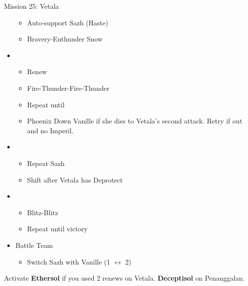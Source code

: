 \begin{multicols}{2}
\begin{battle}[0:38]{Mission 25: Vetala}
\begin{itemize}
\begin{itemize}
				      \item Auto-support Sazh (Haste)
				      \item Bravery-Enthunder Snow
			      \end{itemize}
			\item \fifth
			      \begin{itemize}
				      \item Renew
				      \item Fire-Thunder-Fire-Thunder
				      \item Repeat until \stagger
				      \item Phoenix Down Vanille if she dies to Vetala's second attack. Retry if out and no Imperil.
			      \end{itemize}
			      \columnbreak
			\item \first
			      \begin{itemize}
				      \item Repeat Sazh
				      \item Shift after Vetala has Deprotect
			      \end{itemize}
			\item \fourth
			      \begin{itemize}
				      \item Blitz-Blitz
				      \item Repeat until victory
			      \end{itemize}
		\end{itemize}
	\end{battle}
	\begin{menu}
		\begin{itemize}
			\paradigm
			\begin{itemize}
				\item {}%
				      {\paradigmline{\syn}{(\rav)}{(\sen)}}%
				      {\paradigmline[2]{\textit{\com}}{\textit{\rav}}{\textit{\rav}}}%
				      {\paradigmline{(\rav)}{(\rav)}{(\sen)}}%
				      {\paradigmline{\com}{(\rav)}{\com}}%
				      {\paradigmline{\rav}{\sab}{(\sen)}}%
				      {\paradigmline{\com}{\rav}{\com}}
			\end{itemize}
			\item Battle Team
			      \begin{itemize}
				      \item Switch Sazh with Vanille (1 $\leftrightarrow$ 2)
			      \end{itemize}
		\end{itemize}
	\end{menu}
	 Activate \textbf{Ethersol} if you used 2 renews on Vetala. \textbf{Deceptisol} on Penanggalan.
	\renewcommand{\second}{[2] Relentless Assault (\rav/\rav/\com)}
	\renewcommand{\third}{[3] Mystic Tower (\rav/\rav/\sen)}


\end{multicols}
